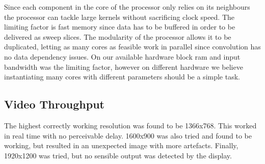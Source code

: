 Since each component in the core of the processor only relies on its neighbours the processor can tackle large kernels without sacrificing clock speed.
The limiting factor is fast memory since data has to be buffered in order to be delivered as sweep slices.
The modularity of the processor allows it to be duplicated, letting as many cores as feasible work in parallel since convolution has no data dependency issues.
On our available hardware block ram and input bandwidth was the limiting factor, however on different hardware we believe instantiating many cores with different parameters should be a simple task.


\subsection{Video Throughput}
The highest correctly working resolution was found to be 1366x768.
This worked in real time with no perceivable delay. 1600x900 was also tried and found to be working, but resulted in an unexpected image with more artefacts. Finally, 1920x1200 was tried, but no sensible output was detected by the display.

